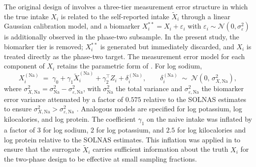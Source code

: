 The original design of \citet{baldoni2021use} involves a three-tier measurement error structure in which the true intake $X_i$ is related to the self-reported intake $\tilde{X}_i$ through a linear Gaussian calibration model, and a biomarker $X^{**}_i = X_i + \varepsilon_i$ with $\varepsilon_i \sim \mathcal{N}(0, \sigma^2_\varepsilon)$ is additionally observed in the phase-two subsample. In the present study, the biomarker tier is removed; $X^{**}_i$ is generated but immediately discarded, and $X_i$ is treated directly as the phase-two target. The measurement error model for each component of $X_i$ retains the parametric form of \citet{baldoni2021use}. For log sodium,
\begin{equation}
    X_i^{(\mathrm{Na})} \;=\; \gamma_0
    + \gamma_1 \tilde{X}_i^{(\mathrm{Na})}
    + \gamma_2^{\top} Z_i
    + \delta_i^{(\mathrm{Na})},
    \qquad
    \delta_i^{(\mathrm{Na})} \;\sim\;
    \mathcal{N}\!\left(0,\, \sigma^2_{X,\mathrm{Na}}\right),
    \label{eq:app_meas_error_na}
\end{equation}
where $\sigma^2_{X,\mathrm{Na}} = \sigma^2_{\mathrm{Na}} - \sigma^2_{\varepsilon,\mathrm{Na}}$, with $\sigma^2_{\mathrm{Na}}$ the total variance and $\sigma^2_{\varepsilon,\mathrm{Na}}$ the biomarker error variance attenuated by a factor of $0.575$ relative to the SOLNAS estimates to ensure $\sigma^2_{X,\mathrm{Na}} > \sigma^2_{\varepsilon,\mathrm{Na}}$ \citep{baldoni2021use}. Analogous models are specified for log potassium, log kilocalories, and log protein. The coefficient $\gamma_1$ on the naive intake was inflated by a factor of $3$ for log sodium, $2$ for log potassium, and $2.5$ for log kilocalories and log protein relative to the SOLNAS estimates. This inflation was applied in \citet{baldoni2021use} to ensure that the surrogate $\tilde{X}_i$ carries sufficient information about the truth $X_i$ for the two-phase design to be effective at small sampling fractions.

